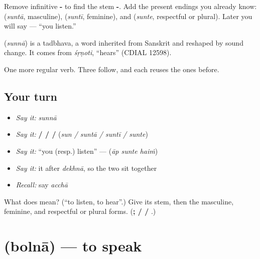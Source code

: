 Remove infinitive \textbf{-} to find the stem \textbf{-}. Add the present endings you already know: \textbf{} (\emph{suntā}, masculine), \textbf{} (\emph{suntī}, feminine), and \textbf{} (\emph{sunte}, respectful or plural). Later you will say \textbf{  } — \textquotedblleft{}you listen.\textquotedblright{}

\begin{cousinweb}
\textbf{} (\emph{sunnā}) is a tadbhava, a word inherited from Sanskrit and reshaped by sound change. It comes from \emph{śṛṇoti}, \textquotedblleft{}hears\textquotedblright{} (CDIAL 12598).
\end{cousinweb}

\begin{grammarlens}[title={What you've built}]
One more regular verb. Three follow, and each reuses the ones before.
\end{grammarlens}

\subsection*{Your turn}
\begin{itemize}
\raggedright
  \item \emph{Say it:} \emph{sunnā}
  \item \emph{Say it:} \textbf{ /  /  / } (\emph{sun / suntā / suntī / sunte})
  \item \emph{Say it:} \textquotedblleft{}you (resp.) listen\textquotedblright{} — \textbf{  } (\emph{āp sunte haiṁ})
  \item \emph{Say it:} it after \emph{dekhnā}, so the two sit together
  \item \emph{Recall:} say \emph{acchā}
\end{itemize}

\begin{tcolorbox}[breakable,colback=teal!4,colframe=teal!35!black,title={Before you move on}]
What does  mean? (\textquotedblleft{}to listen, to hear\textquotedblright{}.) Give its stem, then the masculine, feminine, and respectful or plural forms. (\textbf{;  /  / }.)
\end{tcolorbox}
\section[\texorpdfstring{\hi{बोलना} (bolnā)}{बोलना (bolnā)}]{ (bolnā) — to speak}


